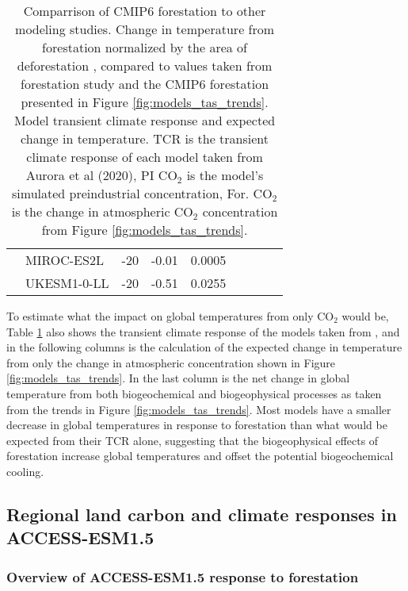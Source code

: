 \documentclass[]{article}
\begin{document}
\begin{table}[]
\begin{tabular}{ll|lllllll}
                     & MIROC-ES2L         & -20          & -0.01     & 0.0005  &         &                   &                           &                                \\
                     & UKESM1-0-LL         & -20          & -0.51     & 0.0255  &         &                   &                           &                                \\ \hline
\end{tabular}
\caption{Comparrison of CMIP6 forestation to other modeling studies. Change in temperature from forestation normalized by the area of deforestation \parencite{boysen_global_2020}, compared to values taken from \parencite{sonntag_quantifying_2018} forestation study and the CMIP6 forestation presented in Figure \ref{fig:models_tas_trends}. Model transient climate response and expected change in temperature. TCR is the transient climate response of each model taken from Aurora et al (2020), PI CO$_2$ is the model's simulated preindustrial concentration, For. CO$_2$ is the change in atmospheric CO$_2$ concentration from Figure \ref{fig:models_tas_trends}.}
    \label{tab:normalized_temperature}
\end{table}

To estimate what the impact on global temperatures from only CO$_2$ would be, Table \ref{tab:normalized_temperature} also shows the transient climate response of the models taken from \cite{arora_carbonconcentration_2020}, and in the following columns is the calculation of the expected change in temperature from only the change in atmospheric concentration shown in Figure \ref{fig:models_tas_trends}.
In the last column is the net change in global temperature from both biogeochemical and biogeophysical processes as taken from the trends in Figure \ref{fig:models_tas_trends}.
Most models have a smaller decrease in global temperatures in response to forestation than what would be expected from their TCR alone, suggesting that the biogeophysical effects of forestation increase global temperatures and offset the potential biogeochemical cooling.

\subsection{Regional land carbon and climate responses in ACCESS-ESM1.5}

\subsubsection{Overview of ACCESS-ESM1.5 response to forestation}
\end{document}
